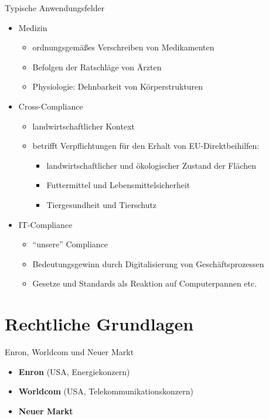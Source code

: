 \documentclass[xcolor=dvipsnames, compress, 10pt]{beamer}
\begin{document}
\begin{frame}{Typische Anwendungsfelder}
\pause
\begin{itemize}[<+->]
	\item Medizin
		\begin{itemize}[<+->]
			\item ordnungsgem\"a{\ss}es Verschreiben von Medikamenten
			\item Befolgen der Ratschl\"age von \"Arzten
			\item Physiologie: Dehnbarkeit von K\"orperstrukturen
		\end{itemize}
	\item Cross-Compliance
		\begin{itemize}[<+->]
			\item landwirtschaftlicher Kontext
			\item betrifft Verpflichtungen f\"ur den Erhalt von EU-Direktbeihilfen:
				\begin{itemize}[<+->]
					\item landwirtschaftlicher und \"okologischer Zustand der Fl\"achen
					\item Futtermittel und Lebensmittelsicherheit
					\item Tiergesundheit und Tierschutz
				\end{itemize}
		\end{itemize}
	\item IT-Compliance
	\begin{itemize}[<+->]
		\item "`unsere"' Compliance
		\item Bedeutungsgewinn durch Digitalisierung von Gesch\"aftsprozessen
		\item Gesetze und Standards als Reaktion auf Computerpannen etc.
	\end{itemize}
\end{itemize}
\end{frame}

\section{Rechtliche Grundlagen}

\begin{frame}{Enron, Worldcom und Neuer Markt}
\begin{itemize}
	\pause
	\item \textbf{Enron} (USA, Energiekonzern)
	\pause
	\item \textbf{Worldcom} (USA, Telekommunikationskonzern)
	\pause
	\item \textbf{Neuer Markt}
\end{itemize}
\end{frame}
\end{document}
